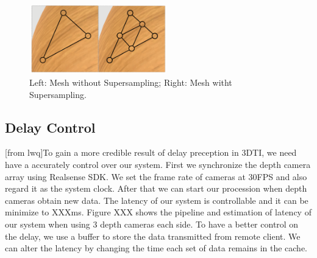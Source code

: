 \begin{figure}[H]
\centering
\includegraphics[width=6cm,height=3cm]{figures/figure_mc.png}
\setlength{\abovecaptionskip}{0.5cm}
\caption{Left: Mesh without Supersampling; Right: Mesh witht Supersampling.}
\label{4}
\end{figure}


\subsection{Delay Control}
[from lwq]To gain a more credible result of delay preception in 3DTI, we need have a accurately control over our system. First we synchronize the depth camera array using Realsense SDK. We set the frame rate of cameras at 30FPS and also regard it as the system clock. After that we can start our procession when depth cameras obtain new data. The latency of our system is controllable and it can be minimize to XXXms. Figure XXX shows the pipeline and estimation of latency of our system when using 3 depth cameras each side. To have a better control on the delay, we use a buffer to store the data transmitted from remote client. We can alter the latency by changing the time each set of data remains in the cache.
